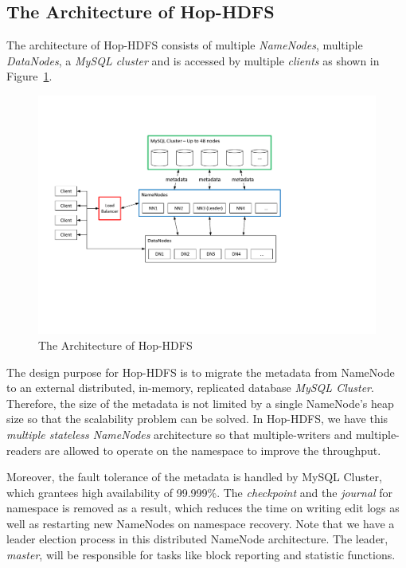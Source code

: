 \subsection{The Architecture of Hop-HDFS}

\noindent The architecture of Hop-HDFS consists of multiple \textit{NameNodes}, multiple \textit{DataNodes}, a \textit{MySQL cluster} and is accessed by multiple \textit{clients} as shown in Figure~\ref{fig:hophdfsarchitecture}.

\begin{figure}[h!]
	\centering
	\includegraphics[scale=0.7]{figs/HopHDFSArchitecture2.pdf}
	\caption{The Architecture of Hop-HDFS}
	\label{fig:hophdfsarchitecture}
\end{figure}

\noindent The design purpose for Hop-HDFS is to migrate the metadata from NameNode to an external distributed, in-memory, replicated database \textit{MySQL Cluster}. Therefore, the size of the metadata is not limited by a single NameNode's heap size so that the scalability problem can be solved. In Hop-HDFS, we have this \textit{multiple stateless NameNodes} architecture so that multiple-writers and multiple-readers are allowed to operate on the namespace to improve the throughput. 

\noindent Moreover, the fault tolerance of the metadata is handled by MySQL Cluster, which grantees high availability of 99.999\%. The \textit{checkpoint} and the \textit{journal} for namespace is removed as a result, which reduces the time on writing edit logs as well as restarting new NameNodes on namespace recovery. Note that we have a leader election process in this distributed NameNode architecture. The leader, \textit{master}, will be responsible for tasks like block reporting and statistic functions.

